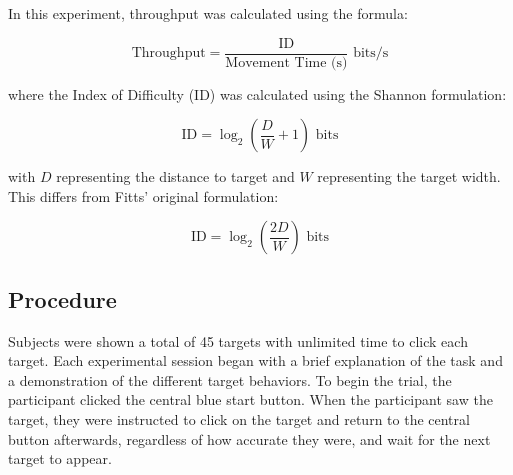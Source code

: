 \documentclass[acmlarge]{acmart}
\begin{document}
In this experiment, throughput was calculated using the formula:

\begin{equation}
\text{Throughput} = \frac{\text{ID}}{\text{Movement Time (s)}} \text{ bits/s}
\end{equation}

where the Index of Difficulty (ID) was calculated using the Shannon formulation:

\begin{equation}
\text{ID} = \log_2\left(\frac{D}{W}+1\right) \text{ bits}
\end{equation}

with $D$ representing the distance to target and $W$ representing the target width. This differs from Fitts' original formulation:

\begin{equation}
\text{ID} = \log_2\left(\frac{2D}{W}\right) \text{ bits}
\end{equation}
\newline




\subsection{Procedure}
Subjects were shown a total of 45 targets with unlimited time to click each target. Each experimental session began with a brief explanation of the task and a demonstration of the different target behaviors. To begin the trial, the participant clicked the central blue start button. When the participant saw the target, they were instructed to click on the target and return to the central button afterwards, regardless of how accurate they were, and wait for the next target to appear. 
\end{document}
